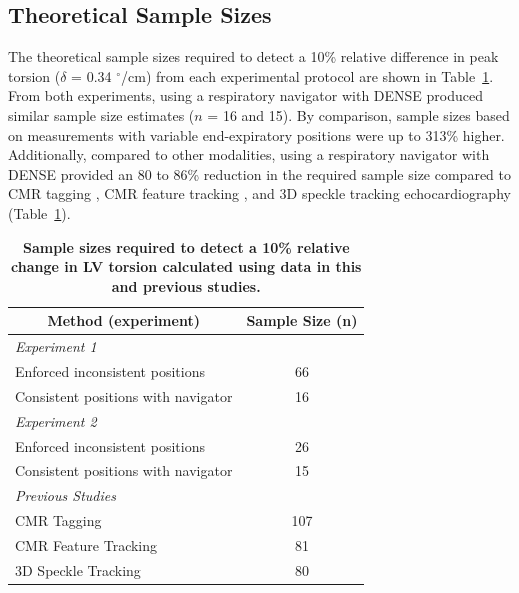 \subsection{Theoretical Sample Sizes}
	The theoretical sample sizes required to detect a 10\% relative difference in peak torsion ($\delta$ = 0.34 $^{\circ}$/cm) from each experimental protocol are shown in Table~\ref{table:samplesize}. From both experiments, using a respiratory navigator with DENSE produced similar sample size estimates ($n$ = 16 and 15). By comparison, sample sizes based on measurements with variable end-expiratory positions were up to 313\% higher. Additionally, compared to other modalities, using a respiratory navigator with DENSE provided an 80 to 86\% reduction in the required sample size compared to CMR tagging \cite{Donekal2013a}, CMR feature tracking \cite{Kowallick2016}, and 3D speckle tracking echocardiography \cite{Kaku2014a} (Table~\ref{table:samplesize}).

	\begin{table}
		\centering
		\caption[Mean ($\pm$ standard deviation) of torsion across the volunteers within each experiment]{\textbf{Sample sizes required to detect a 10\% relative change in LV torsion calculated using data in this and previous studies.}}
		\label{table:samplesize}
		\begin{tabular}{c  c}
			\toprule
			\multicolumn{1}{c}{\textbf{Method (experiment)}}       			& \multicolumn{1}{c}{\textbf{Sample Size (n)}} \\ \midrule
			\multicolumn{1}{l}{\textit{Experiment 1}}                       & \multicolumn{1}{c}{}                         \\
			\multicolumn{1}{l}{\qquad Enforced inconsistent positions}      & 66          								   \\
			\multicolumn{1}{l}{\qquad Consistent positions with navigator}  & 16		   								   \\
			\multicolumn{1}{l}{\textit{Experiment 2}}                       & \multicolumn{1}{c}{}        				   \\
			\multicolumn{1}{l}{\qquad Enforced inconsistent positions}      & 26   		   								   \\
			\multicolumn{1}{l}{\qquad Consistent positions with navigator}  & 15     	   								   \\
			\multicolumn{1}{l}{\textit{Previous Studies}}                   & \multicolumn{1}{c}{}        				   \\
			\multicolumn{1}{l}{\qquad CMR Tagging \cite{Donekal2013a}}      & 107   		   							   \\
			\multicolumn{1}{l}{\qquad CMR Feature Tracking \cite{Kowallick2016}}  & 81     	   						   \\    
			\multicolumn{1}{l}{\qquad 3D Speckle Tracking \cite{Kaku2014a}}  & 80     	   						   \\           
			\bottomrule                       
		\end{tabular}
	\end{table}

